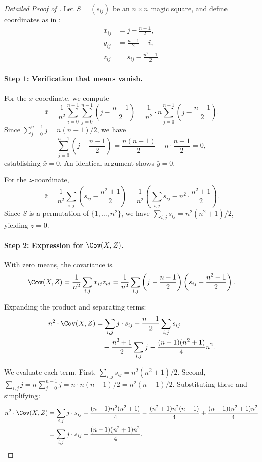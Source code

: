 \begin{proof}[Detailed Proof of ]
Let $S = (s_{ij})$ be an $n \times n$ magic square,
and define coordinates as in :
\begin{align*}
x_{ij} &= j - \frac{n-1}{2}, \\
y_{ij} &= \frac{n-1}{2} - i, \\
z_{ij} &= s_{ij} - \frac{n^2+1}{2}.
\end{align*}

\paragraph{Step 1: Verification that means vanish.}
For the $x$-coordinate, we compute
\[
\bar{x} = \frac{1}{n^2} \sum_{i=0}^{n-1} \sum_{j=0}^{n-1} \left( j - \frac{n-1}{2} \right)
= \frac{1}{n^2} \cdot n \sum_{j=0}^{n-1} \left( j - \frac{n-1}{2} \right).
\]
Since $\sum_{j=0}^{n-1} j = n(n-1)/2$, we have
\[
\sum_{j=0}^{n-1} \left( j - \frac{n-1}{2} \right) = \frac{n(n-1)}{2} - n \cdot \frac{n-1}{2} = 0,
\]
establishing $\bar{x} = 0$. An identical argument shows $\bar{y} = 0$.

For the $z$-coordinate,
\[
\bar{z} = \frac{1}{n^2} \sum_{i,j} \left( s_{ij} - \frac{n^2+1}{2} \right)
= \frac{1}{n^2} \left( \sum_{i,j} s_{ij} - n^2 \cdot \frac{n^2+1}{2} \right).
\]
Since $S$ is a permutation of $\{1, \ldots, n^2\}$, we have $\sum_{i,j} s_{ij} = n^2(n^2+1)/2$,
yielding $\bar{z} = 0$.

\paragraph{Step 2: Expression for $\Cov(X, Z)$.}
With zero means, the covariance is
\[
\Cov(X, Z) = \frac{1}{n^2} \sum_{i,j} x_{ij} z_{ij}
= \frac{1}{n^2} \sum_{i,j} \left( j - \frac{n-1}{2} \right) \left( s_{ij} - \frac{n^2+1}{2} \right).
\]

Expanding the product and separating terms:
\begin{align*}
n^2 \cdot \Cov(X, Z) &= \sum_{i,j} j \cdot s_{ij} 
- \frac{n-1}{2} \sum_{i,j} s_{ij} \\
&\quad - \frac{n^2+1}{2} \sum_{i,j} j 
+ \frac{(n-1)(n^2+1)}{4} n^2.
\end{align*}

We evaluate each term. First, $\sum_{i,j} s_{ij} = n^2(n^2+1)/2$.
Second, $\sum_{i,j} j = n \sum_{j=0}^{n-1} j = n \cdot n(n-1)/2 = n^2(n-1)/2$.
Substituting these and simplifying:
\begin{align*}
n^2 \cdot \Cov(X, Z) &= \sum_{i,j} j \cdot s_{ij} 
- \frac{(n-1) n^2 (n^2+1)}{4} 
- \frac{(n^2+1) n^2 (n-1)}{4} 
+ \frac{(n-1)(n^2+1) n^2}{4} \\
&= \sum_{i,j} j \cdot s_{ij} - \frac{(n-1)(n^2+1) n^2}{4}.
\end{align*}


\end{proof}
